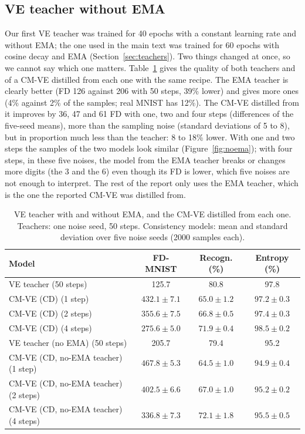 \documentclass{article}
\begin{document}
\clearpage
\subsection{VE teacher without EMA}
\label{sec:app_noema}

Our first VE teacher was trained for 40 epochs with a constant learning rate and
without EMA; the one used in the main text was trained for 60 epochs with cosine
decay and EMA (Section~\ref{sec:teachers}). Two things changed at once, so we
cannot say which one matters. Table~\ref{tab:noema} gives the quality of both
teachers and of a CM-VE distilled from each one with the same recipe. The EMA
teacher is clearly better (FD 126 against 206 with 50 steps, 39\% lower) and gives
more ones (4\% against 2\% of the samples; real MNIST has 12\%). The CM-VE
distilled from it improves by 36, 47 and 61 FD with one, two and four steps
(differences of the five-seed means), more than the sampling noise (standard
deviations of 5 to 8), but in proportion much less than the teacher: 8 to 18\%
lower. With one and two steps the samples of the two models look similar
(Figure~\ref{fig:noema}); with four steps, in these five noises, the model from the
EMA teacher breaks or changes more digits (the 3 and the 6) even though its FD is
lower, which five noises are not enough to interpret. The rest of the report only
uses the EMA teacher, which is the one the reported CM-VE was distilled from.

\begin{table}[H]
  \caption{VE teacher with and without EMA, and the CM-VE distilled from each one.
  Teachers: one noise seed, 50 steps. Consistency models: mean and standard
  deviation over five noise seeds (2000 samples each).}
  \label{tab:noema}
  \centering
  \footnotesize
  \begin{tabular}{lccc}
    \toprule
    Model & FD-MNIST & Recogn. (\%) & Entropy (\%) \\
    \midrule
    VE teacher (50 steps) & 125.7 & 80.8 & 97.8 \\
    CM-VE (CD) (1 step) & $432.1 \pm 7.1$ & $65.0 \pm 1.2$ & $97.2 \pm 0.3$ \\
    CM-VE (CD) (2 steps) & $355.6 \pm 7.5$ & $66.8 \pm 0.5$ & $97.4 \pm 0.3$ \\
    CM-VE (CD) (4 steps) & $275.6 \pm 5.0$ & $71.9 \pm 0.4$ & $98.5 \pm 0.2$ \\
    \midrule
    VE teacher (no EMA) (50 steps) & 205.7 & 79.4 & 95.2 \\
    CM-VE (CD, no-EMA teacher) (1 step) & $467.8 \pm 5.3$ & $64.5 \pm 1.0$ & $94.9 \pm 0.4$ \\
    CM-VE (CD, no-EMA teacher) (2 steps) & $402.5 \pm 6.6$ & $67.0 \pm 1.0$ & $95.2 \pm 0.2$ \\
    CM-VE (CD, no-EMA teacher) (4 steps) & $336.8 \pm 7.3$ & $72.1 \pm 1.8$ & $95.5 \pm 0.5$ \\
    \bottomrule
  \end{tabular}
\end{table}
\end{document}
